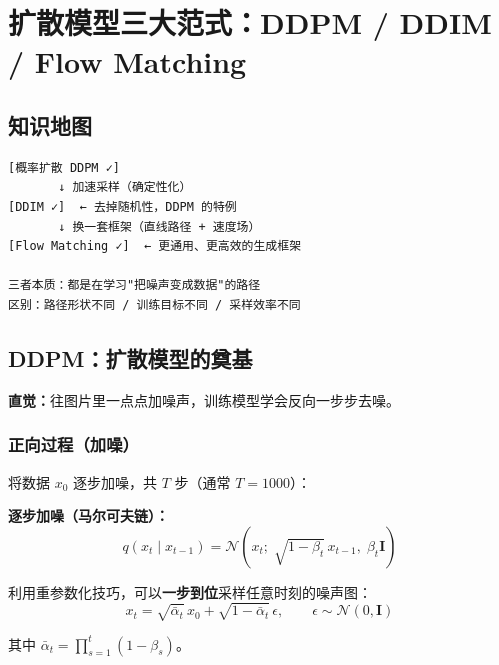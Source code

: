 
\section{扩散模型三大范式：DDPM / DDIM / Flow Matching}


\subsection*{知识地图}

\begin{lstlisting}[language={}]
[概率扩散 DDPM ✓]
       ↓ 加速采样（确定性化）
[DDIM ✓]  ← 去掉随机性，DDPM 的特例
       ↓ 换一套框架（直线路径 + 速度场）
[Flow Matching ✓]  ← 更通用、更高效的生成框架

三者本质：都是在学习"把噪声变成数据"的路径
区别：路径形状不同 / 训练目标不同 / 采样效率不同
\end{lstlisting}

\subsection{DDPM：扩散模型的奠基}

\begin{intubox}
\textbf{直觉：}往图片里一点点加噪声，训练模型学会反向一步步去噪。
\end{intubox}

\subsubsection*{正向过程（加噪）}

将数据 $x_0$ 逐步加噪，共 $T$ 步（通常 $T = 1000$）：

\begin{conceptbox}
\textbf{逐步加噪（马尔可夫链）：}
$$q(x_t \mid x_{t-1}) = \mathcal{N}\!\left(x_t;\; \sqrt{1-\beta_t}\, x_{t-1},\;
\beta_t \mathbf{I}\right)$$

利用重参数化技巧，可以\textbf{一步到位}采样任意时刻的噪声图：
$$x_t = \sqrt{\bar{\alpha}_t}\, x_0 + \sqrt{1 - \bar{\alpha}_t}\, \epsilon,
\qquad \epsilon \sim \mathcal{N}(0, \mathbf{I})$$

其中 $\displaystyle\bar{\alpha}_t = \prod_{s=1}^{t}(1 - \beta_s)$。
\end{conceptbox}

